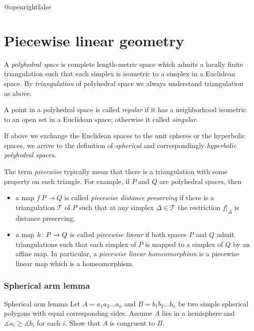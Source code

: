 \csname @openrightfalse\endcsname
\chapter{Piecewise linear geometry}


A \emph{polyhedral space} is complete length-metric space which admits a locally finite triangulation 
such that each simplex is isometric to a simplex in a Euclidean space.
By {}\emph{triangulation} of polyhedral space we always understand triangulation as above. 

A point in a polyhedral space is called \emph{regular} if it has a neighborhood isometric to an open set in a Euclidean space;
otherwise it called {}\emph{singular}.

If above we exchange the Euclidean spaces to the unit spheres or the hyperbolic spaces,
we arrive to the definition of {}\emph{spherical} and correspondingly {}\emph{hyperbolic polyhedral spaces}.

The term \emph{piecewise} typically mean that there is a triangulation with some property on each triangle.
For example,  if $P$ and $Q$ are polyhedral spaces, then
\begin{itemize}
\item a map $f\:P\to Q$ is called {}\emph{piecewise distance preserving} if there is a triangulation $\mathcal{T}$ of $P$ such that at any simplex $\Delta\in \mathcal{T}$ the restriction $f|_\Delta$ is distance preserving,
\item a map $h\:P\z\to Q$  is called \emph{piecewise linear} if both spaces $P$ and $Q$ admit triangulations such that each simplex of $P$ is mapped to a simplex of $Q$ by an affine map.
In particular, a {}\emph{piecewise linear homeomorphism} is a piecewise linear map which is a homeomorphism.\label{piecewise linear map}
\end{itemize}





\subsection*{Spherical arm lemma}

\begin{pr}{}{Spherical arm lemma}\label{Spherical arm lemma}
Let $A=a_1a_2\dots a_n$ and $B=b_1b_2\dots b_n$ be two simple spherical polygons 
with equal corresponding sides.
Assume $A$ lies in a hemisphere and $\measuredangle a_i\ge\measuredangle b_i$ for each $i$.
Show that $A$ is congruent to $B$.
\end{pr}

